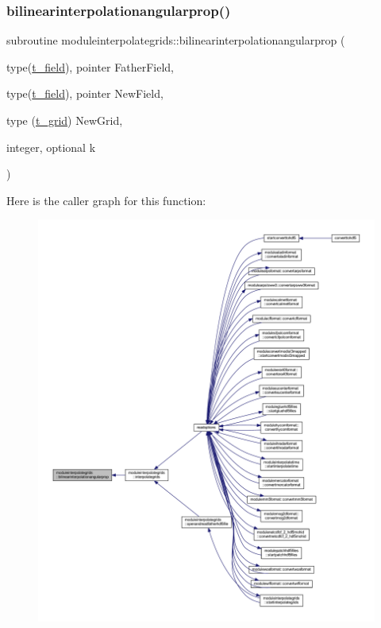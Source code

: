 \subsubsection{\texorpdfstring{bilinearinterpolationangularprop()}{bilinearinterpolationangularprop()}}
{\footnotesize\ttfamily subroutine moduleinterpolategrids\+::bilinearinterpolationangularprop (\begin{DoxyParamCaption}\item[{type(\mbox{\hyperlink{structmoduleinterpolategrids_1_1t__field}{t\+\_\+field}}), pointer}]{Father\+Field,  }\item[{type(\mbox{\hyperlink{structmoduleinterpolategrids_1_1t__field}{t\+\_\+field}}), pointer}]{New\+Field,  }\item[{type (\mbox{\hyperlink{structmoduleinterpolategrids_1_1t__grid}{t\+\_\+grid}})}]{New\+Grid,  }\item[{integer, optional}]{k }\end{DoxyParamCaption})\hspace{0.3cm}{\ttfamily [private]}}

Here is the caller graph for this function\+:\nopagebreak
\begin{figure}[H]
\begin{center}
\leavevmode
\includegraphics[width=350pt]{namespacemoduleinterpolategrids_ad1fbdcc1429662d0522479b1e7933859_icgraph}
\end{center}
\end{figure}
\mbox{\label{namespacemoduleinterpolategrids_ae09eebd1096118a9d8f6af67ad2eeb67}} 
